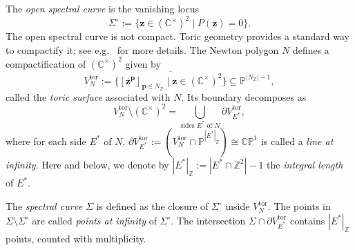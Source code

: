 \documentclass[12pt]{amsart}
\numberwithin{equation}{section}
\theoremstyle{definition}
\newcommand{\Z}{\mathbb{Z}}
\newcommand{\C}{\mathbb{C}}
\def\toricsurface{V_N^{\mathrm{tor}}}
\def\spectralcurve{\Sigma}
\def\openspectralcurve{{\Sigma^{\circ}}}
\def\pt{{\bm{p}}} %
\def\ptC{{\bm{z}}} %
\def\NZ{N_{\Z}}
\def\Eside{{E^\ast}}
\def\Pbb{\mathbb{P}}
\def\mcurve{\Sigma}
\begin{document}
The \emph{open spectral curve} is the vanishing locus
\[
\mcurve^\circ := \{\ptC \in (\C^\times)^2 \mid P(\ptC) = 0\}.
\]
The open spectral curve is not compact. Toric geometry provides a standard way to compactify it; see e.g.~\cite{GKZ} for more details. The Newton polygon $N$ defines a compactification of $(\C^\times)^2$ given by
\[
\toricsurface := 
\overline{ \{ [\ptC^\pt]_{\pt \in \NZ} \mid \ptC \in (\C^\times)^2 \}} 
\subseteq \mathbb P^{|\NZ|-1},
\]
called the \emph{toric surface} associated with $N$.
Its boundary decomposes as
\[
\toricsurface \setminus (\C^\times)^2 
= \bigcup_{\text{sides $\Eside$ of $N$}} \partial V^{\mathrm{tor}}_\Eside,
\]
where for each side $\Eside$ of $N$, 
$\partial V^{\mathrm{tor}}_\Eside:=(\toricsurface\cap\Pbb^{|\Eside|_\Z}) \cong \C\mathbb P^1$
 is called a \emph{line at infinity}.
\noindent Here and below, we denote by $|\Eside|_\Z:=|\Eside\cap\Z^2|-1$ the \emph{integral length} of $\Eside$. 

The \emph{spectral curve} $\mcurve$ is defined as the closure of $\openspectralcurve$ inside $\toricsurface$. The points in $\spectralcurve \setminus \openspectralcurve$ are called 
\emph{points at infinity} of $\openspectralcurve$. The intersection $\spectralcurve \cap \partial V^{\mathrm{tor}}_\Eside$ contains $|\Eside|_\Z$ points, counted with multiplicity. 
\end{document}
